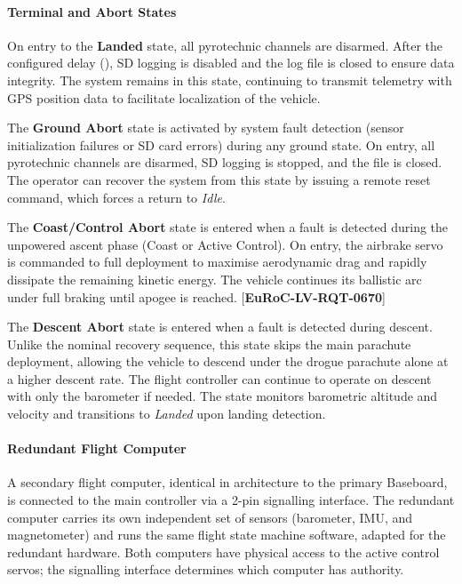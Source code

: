 \documentclass[11pt, a4paper]{article} %
\newcommand{\req}[1]{[\textcolor{EtseNavy}{\textbf{#1}}]}
\begin{document}
\paragraph{Terminal and Abort States}

On entry to the \textbf{Landed} state, all pyrotechnic channels are disarmed. After the configured delay (), SD logging is disabled and the log file is closed to ensure data integrity. The system remains in this state, continuing to transmit telemetry with GPS position data to facilitate localization of the vehicle.

The \textbf{Ground Abort} state is activated by system fault detection (sensor initialization failures or SD card errors) during any ground state. On entry, all pyrotechnic channels are disarmed, SD logging is stopped, and the file is closed. The operator can recover the system from this state by issuing a remote reset command, which forces a return to \emph{Idle}.

The \textbf{Coast/Control Abort} state is entered when a fault is detected during the unpowered ascent phase (Coast or Active Control). On entry, the airbrake servo is commanded to full deployment to maximise aerodynamic drag and rapidly dissipate the remaining kinetic energy. The vehicle continues its ballistic arc under full braking until apogee is reached. \req{EuRoC-LV-RQT-0670}

The \textbf{Descent Abort} state is entered when a fault is detected during descent. Unlike the nominal recovery sequence, this state skips the main parachute deployment, allowing the vehicle to descend under the drogue parachute alone at a higher descent rate. The flight controller can continue to operate on descent with only the barometer if needed. The state monitors barometric altitude and velocity and transitions to \emph{Landed} upon landing detection.

\paragraph{Redundant Flight Computer}

A secondary flight computer, identical in architecture to the primary Baseboard, is connected to the main controller via a 2-pin signalling interface. The redundant computer carries its own independent set of sensors (barometer, IMU, and magnetometer) and runs the same flight state machine software, adapted for the redundant hardware. Both computers have physical access to the active control servos; the signalling interface determines which computer has authority.
\end{document}
